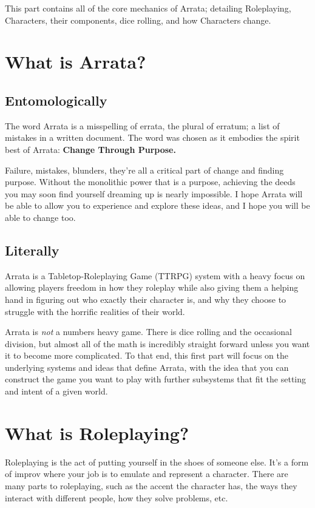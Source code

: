 \documentclass[../main.tex]{subfiles}
\begin{document}
    This part contains all of the core mechanics of Arrata; detailing Roleplaying, Characters, their components, dice rolling, and how Characters change.

    \section{What is Arrata?}

    \subsection{Entomologically}
    The word Arrata is a misspelling of errata, the plural of erratum; a list of mistakes in a written document. The word was chosen as it embodies the spirit best of Arrata: \textbf{Change Through Purpose.}

    Failure, mistakes, blunders, they're all a critical part of change and finding purpose. Without the monolithic power that is a purpose, achieving the deeds you may soon find yourself dreaming up is nearly impossible. I hope Arrata will be able to allow you to experience and explore these ideas, and I hope you will be able to change too.
    
    \subsection{Literally}
    Arrata is a Tabletop-Roleplaying Game (TTRPG) system with a heavy focus on allowing players freedom in how they roleplay while also giving them a helping hand in figuring out who exactly their character is, and why they choose to struggle with the horrific realities of their world.

    Arrata is {\em not} a numbers heavy game. There is dice rolling and the occasional division, but almost all of the math is incredibly straight forward unless you want it to become more complicated. To that end, this first part will focus on the underlying systems and ideas that define Arrata, with the idea that you can construct the game you want to play with further subsystems that fit the setting and intent of a given world.
    

    \section{What is Roleplaying?}

    Roleplaying is the act of putting yourself in the shoes of someone else. It's a form of improv where your job is to emulate and represent a character. There are many parts to roleplaying, such as the accent the character has, the ways they interact with different people, how they solve problems, etc.
    
\end{document}
